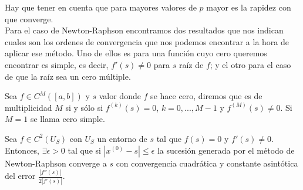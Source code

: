 Hay que tener en cuenta que para mayores valores de $p$ mayor es la rapidez con que converge.
${ }$\\

Para el caso de Newton-Raphson encontramos dos resultados que nos indican cuales son los ordenes de convergencia que nos podemos encontrar a la hora de aplicar ese método. Uno de ellos es para una función cuyo cero queremos encontrar es simple, es decir, $f'(s) \neq 0$ para $s$ raíz de $f$; y el otro para el caso de que la raíz sea un cero múltiple.

\begin{definicion}
	Sea $f \in C^M([a,b])$ y $s$ valor donde $f$ se hace cero, diremos que es de multiplicidad $M$ si y sólo si $f^{(k)}(s) = 0$, $k = 0, ..., M-1$ y $f^{(M)}(s) \neq 0$. Si $M = 1$ se llama cero simple.
\end{definicion}

\begin{teorema}
	Sea $f \in C^2(U_S)$ con $U_S$ un entorno de $s$ tal que $f(s) = 0$ y $f'(s) \neq 0$. Entonces, $\exists \epsilon > 0$ tal que si $|x^{(0)} - s| \leq \epsilon$ la sucesión generada por el método de Newton-Raphson converge a $s$ con convergencia cuadrática y constante asintótica del error $\frac{|f''(s)|}{2|f'(s)|}$.
\end{teorema}


